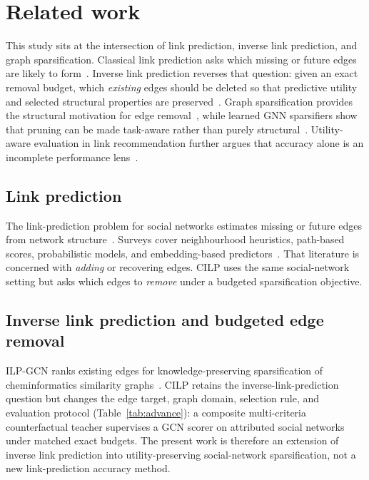 \section{Related work}
\label{sec:related}

This study sits at the intersection of link prediction, inverse link prediction, and graph sparsification.
Classical link prediction asks which missing or future edges are likely to form~\citep{liben2007link,martinez2016survey}.
Inverse link prediction reverses that question: given an exact removal budget, which \emph{existing} edges should be deleted so that predictive utility and selected structural properties are preserved~\citep{bangian2025ilp}.
Graph sparsification provides the structural motivation for edge removal~\citep{lindner2015structure,hamann2016structure,chen2024demystifying,feng2016spectral,spielman2011graph}, while learned GNN sparsifiers show that pruning can be made task-aware rather than purely structural~\citep{luo2021ptdnet,zheng2020neuralsparse,li2020sgcn,li2022gcnsparsify}.
Utility-aware evaluation in link recommendation further argues that accuracy alone is an incomplete performance lens~\citep{sanzcruzado2018novelty,mara2022evalne,li2017utility}.

\subsection{Link prediction}
The link-prediction problem for social networks estimates missing or future edges from network structure~\citep{liben2007link}.
Surveys cover neighbourhood heuristics, path-based scores, probabilistic models, and embedding-based predictors~\citep{martinez2016survey}.
That literature is concerned with \emph{adding} or recovering edges.
CILP uses the same social-network setting but asks which edges to \emph{remove} under a budgeted sparsification objective.

\subsection{Inverse link prediction and budgeted edge removal}
ILP-GCN ranks existing edges for knowledge-preserving sparsification of cheminformatics similarity graphs~\citep{bangian2025ilp}.
CILP retains the inverse-link-prediction question but changes the edge target, graph domain, selection rule, and evaluation protocol (Table~\ref{tab:advance}): a composite multi-criteria counterfactual teacher supervises a GCN scorer on attributed social networks under matched exact budgets.
The present work is therefore an extension of inverse link prediction into utility-preserving social-network sparsification, not a new link-prediction accuracy method.

